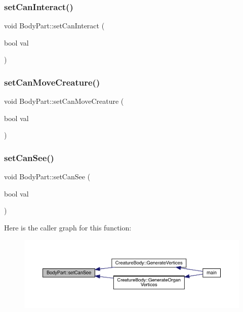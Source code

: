 \subsubsection{\texorpdfstring{set\+Can\+Interact()}{setCanInteract()}}
{\footnotesize\ttfamily void Body\+Part\+::set\+Can\+Interact (\begin{DoxyParamCaption}\item[{bool}]{val }\end{DoxyParamCaption})}

\mbox{\label{class_body_part_a8a6352fc3a764e8358f52f17caaa2867}} 
\subsubsection{\texorpdfstring{set\+Can\+Move\+Creature()}{setCanMoveCreature()}}
{\footnotesize\ttfamily void Body\+Part\+::set\+Can\+Move\+Creature (\begin{DoxyParamCaption}\item[{bool}]{val }\end{DoxyParamCaption})}

\mbox{\label{class_body_part_acc7c6792cd9837901dfb7d639714eb00}} 
\subsubsection{\texorpdfstring{set\+Can\+See()}{setCanSee()}}
{\footnotesize\ttfamily void Body\+Part\+::set\+Can\+See (\begin{DoxyParamCaption}\item[{bool}]{val }\end{DoxyParamCaption})}

Here is the caller graph for this function\+:
\nopagebreak
\begin{figure}[H]
\begin{center}
\leavevmode
\includegraphics[width=350pt]{d2/d6f/class_body_part_acc7c6792cd9837901dfb7d639714eb00_icgraph}
\end{center}
\end{figure}
\mbox{\label{class_body_part_acc147f8434d4bf881ee4b54e1b79c439}} 

